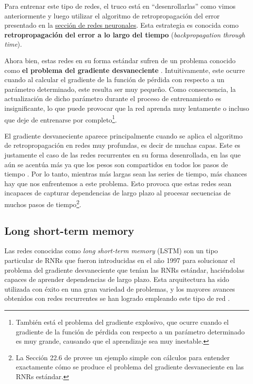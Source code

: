 \documentclass[../../main.tex]{subfiles}
\begin{document}
Para entrenar este tipo de redes, el truco está en ``desenrollarlas'' como vimos
anteriormente y luego utilizar el algoritmo de retropropagación del error presentado en la
\hyperref[chap:rna]{sección de redes neuronales}. Esta estrategia es conocida como
\textbf{retropropagación del error a lo largo del tiempo} (\textit{backpropagation through
time}).

Ahora bien, estas redes en su forma estándar sufren de un problema conocido como
\textbf{el problema del gradiente desvaneciente} \cite{vanishing-gradient}.
Intuitivamente, este ocurre cuando al calcular el gradiente de la función de pérdida con
respecto a un parámetro determinado, este resulta ser muy pequeño. Como consecuencia, la
actualización de dicho parámetro durante el proceso de entrenamiento es insignificante, lo
que puede provocar que la red aprenda muy lentamente o incluso que deje de entrenarse por
completo\footnote{También está el problema del gradiente explosivo, que ocurre cuando el
gradiente de la función de pérdida con respecto a un parámetro determinado es muy grande,
causando que el aprendizaje sea muy inestable.}.

El gradiente desvaneciente aparece principalmente cuando se aplica el algoritmo de
retropropagación en redes muy profundas, es decir de muchas capas. Este es justamente el
caso de las redes recurrentes en su forma desenrollada, en las que aún se acentúa más ya
que los pesos son compartidos en todos los pasos de tiempo \cite{deep-learning}. Por lo
tanto, mientras más largas sean las series de tiempo, más chances hay que nos enfrentemos
a este problema. Esto provoca que estas redes sean incapaces de capturar dependencias de
largo plazo al procesar secuencias de muchos pasos de tiempo\footnote{La Sección 22.6 de
\cite{ai-a-modern-approach} provee un ejemplo simple con cálculos para entender
exactamente cómo se produce el problema del gradiente desvaneciente en las RNRs
estándar.}.

\subsection{Long short-term memory}
Las redes conocidas como \textit{long short-term memory} (LSTM) son un tipo particular de
RNRs que fueron introducidas en el año 1997 \cite{lstm-paper-1997} para solucionar el
problema del gradiente desvaneciente que tenían las RNRs estándar, haciéndolas capaces
de aprender dependencias de largo plazo. Esta arquitectura ha sido utilizada con éxito en
una gran variedad de problemas, y los mayores avances obtenidos con redes recurrentes se
han logrado empleando este tipo de red \cite{colahs-blog-lstm-2015}.
\end{document}
